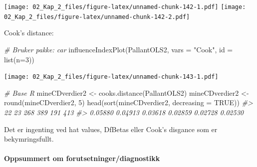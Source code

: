 \documentclass[
]{article}
\newenvironment{Shaded}{\begin{snugshade}}{\end{snugshade}}
\newcommand{\AttributeTok}[1]{\textcolor[rgb]{0.77,0.63,0.00}{#1}}
\newcommand{\CommentTok}[1]{\textcolor[rgb]{0.56,0.35,0.01}{\textit{#1}}}
\newcommand{\ConstantTok}[1]{\textcolor[rgb]{0.00,0.00,0.00}{#1}}
\newcommand{\DecValTok}[1]{\textcolor[rgb]{0.00,0.00,0.81}{#1}}
\newcommand{\FunctionTok}[1]{\textcolor[rgb]{0.00,0.00,0.00}{#1}}
\newcommand{\NormalTok}[1]{#1}
\newcommand{\OtherTok}[1]{\textcolor[rgb]{0.56,0.35,0.01}{#1}}
\newcommand{\StringTok}[1]{\textcolor[rgb]{0.31,0.60,0.02}{#1}}
\begin{document}
\texttt{[image: 02\_Kap\_2\_files/figure-latex/unnamed-chunk-142-1.pdf]} \texttt{[image: 02\_Kap\_2\_files/figure-latex/unnamed-chunk-142-2.pdf]}

Cook's distance:

\begin{Shaded}
\begin{Highlighting}[]
\CommentTok{\# Bruker pakke: car}
\FunctionTok{influenceIndexPlot}\NormalTok{(PallantOLS2, }\AttributeTok{vars =} \StringTok{"Cook"}\NormalTok{, }\AttributeTok{id =} \FunctionTok{list}\NormalTok{(}\AttributeTok{n=}\DecValTok{3}\NormalTok{))}
\end{Highlighting}
\end{Shaded}

\texttt{[image: 02\_Kap\_2\_files/figure-latex/unnamed-chunk-143-1.pdf]}

\begin{Shaded}
\begin{Highlighting}[]
\CommentTok{\# Base R}
\NormalTok{mineCDverdier2 }\OtherTok{\textless{}{-}} \FunctionTok{cooks.distance}\NormalTok{(PallantOLS2)}
\NormalTok{mineCDverdier2 }\OtherTok{\textless{}{-}} \FunctionTok{round}\NormalTok{(mineCDverdier2, }\DecValTok{5}\NormalTok{)}
\FunctionTok{head}\NormalTok{(}\FunctionTok{sort}\NormalTok{(mineCDverdier2, }\AttributeTok{decreasing =} \ConstantTok{TRUE}\NormalTok{))}
\CommentTok{\#\textgreater{}      22      23     268     389     191     413 }
\CommentTok{\#\textgreater{} 0.05880 0.04913 0.03618 0.02859 0.02728 0.02530}
\end{Highlighting}
\end{Shaded}

Det er ingenting ved hat values, DfBetas eller Cook's disgance som er bekymringsfullt.

\hypertarget{oppsummert-om-forutsetningerdiagnostikk-1}{%
\paragraph{Oppsummert om forutsetninger/diagnostikk}\label{oppsummert-om-forutsetningerdiagnostikk-1}}
\end{document}
